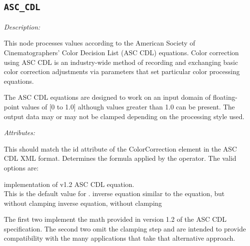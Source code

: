 \subsection{\texttt{ASC\_CDL}}

\emph{Description:} \par
This node processes values according to the American Society of Cinematographers' Color Decision List (ASC CDL) equations. Color correction using ASC CDL is an industry-wide method of recording and exchanging basic color correction adjustments via parameters that set particular color processing equations.

The ASC CDL equations are designed to work on an input domain of floating-point values of [0 to 1.0] although values greater than 1.0 can be present. The output data may or may not be clamped depending on the processing style used.


\emph{Attributes:}
\begin{xmlfields}
	\xmlitem[id][optional] This should match the id attribute of the ColorCorrection element in the ASC CDL XML format.
	\xmlitem[style][optional] Determines the formula applied by the operator. The valid options are:
		\begin{xmlfields}
			\xmlitemd["Fwd"] implementation of v1.2 ASC CDL equation. \\
			This is the default value for .
			\xmlitemd["Rev"] inverse equation
			\xmlitemd["FwdNoClamp"] similar to the  equation, but without clamping
			\xmlitemd["RevNoClamp"] inverse equation, without clamping
		\end{xmlfields}
		The first two implement the math provided in version 1.2 of the ASC CDL specification.  The second two omit the clamping step and are intended to provide compatibility with the many applications that take that alternative approach.
\end{xmlfields}

